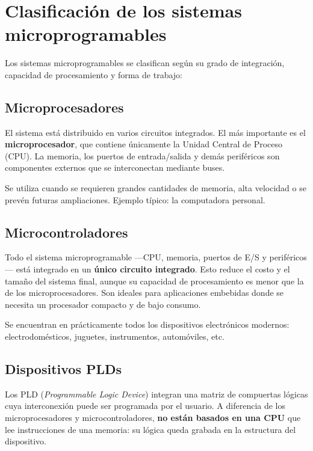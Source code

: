 \section{Clasificación de los sistemas microprogramables}

Los sistemas microprogramables se clasifican según su grado de integración, capacidad de procesamiento y forma de trabajo:

\subsection{Microprocesadores}

El sistema está distribuido en varios circuitos integrados. El más importante es el \textbf{microprocesador}, que contiene únicamente la Unidad Central de Proceso (CPU). La memoria, los puertos de entrada/salida y demás periféricos son componentes externos que se interconectan mediante buses.

Se utiliza cuando se requieren grandes cantidades de memoria, alta velocidad o se prevén futuras ampliaciones. Ejemplo típico: la computadora personal.

\subsection{Microcontroladores}

Todo el sistema microprogramable ---CPU, memoria, puertos de E/S y periféricos--- está integrado en un \textbf{único circuito integrado}. Esto reduce el costo y el tamaño del sistema final, aunque su capacidad de procesamiento es menor que la de los microprocesadores. Son ideales para aplicaciones embebidas donde se necesita un procesador compacto y de bajo consumo.

Se encuentran en prácticamente todos los dispositivos electrónicos modernos: electrodomésticos, juguetes, instrumentos, automóviles, etc.

\subsection{Dispositivos PLDs}

Los PLD (\textit{Programmable Logic Device}) integran una matriz de compuertas lógicas cuya interconexión puede ser programada por el usuario. A diferencia de los microprocesadores y microcontroladores, \textbf{no están basados en una CPU} que lee instrucciones de una memoria: su lógica queda grabada en la estructura del dispositivo.

